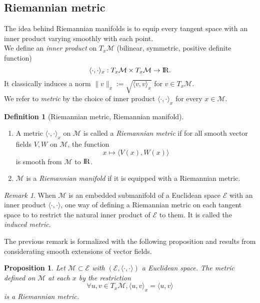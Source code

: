 \documentclass[10pt,a4paper]{book}
\theoremstyle{definition}
\newtheorem{defn}{Definition}[section]
\theoremstyle{plain}
\newtheorem{prop}{Proposition}[section]
\theoremstyle{remark}
\newtheorem{rmk}{Remark}[section]
\newcommand{\E}{\mathcal{E}}
\newcommand \M {\mathcal{M}}
\def\R{{\rm I\kern-0.16em R}}
\begin{document}
\subsection{Riemannian metric}
The idea behind Riemannian manifolds is to equip every tangent space with an inner product varying smoothly with each point.\\ We define an \emph{inner product} on $T_x\M$ (bilinear, symmetric, positive definite function) $$\langle \cdot,\cdot \rangle_x: T_x\M \times T_x\M \to \R.$$ It classically induces a norm $\|v\|_x:=\sqrt{\langle v,v\rangle_x}$ for $v\in T_x\M$.
\\ We refer to \emph{metric} by the choice of inner product $\langle \cdot, \cdot \rangle_x$ for every $x\in \M$.
\begin{defn}[Riemannian metric, Riemannian manifold]~
\begin{enumerate}
\item 
A metric $\langle \cdot, \cdot \rangle_x$ on $\M$ is called a \emph{Riemannian metric} if for all smooth vector fields $V,W$ on $\M$, the function
$$x\mapsto \langle V(x),W(x)\rangle$$
is smooth from $\M$ to $\R$.
\item $\M$ is a \emph{Riemannian manifold} if it is equipped with a Riemannian metric.
\end{enumerate}
\end{defn}
\begin{rmk}
When $\M$ is an embedded submanifold of a Euclidean space $\E$ with an inner product $\langle \cdot, \cdot \rangle$, one way of defining a Riemannian metric on each tangent space to to restrict the natural inner product of $\E$ to them. It is called the \emph{induced metric}.
\end{rmk}
The previous remark is formalized with the following proposition and results from considerating smooth extensions of vector fields.
\begin{prop}
Let $\M \subset \E$ with $(\E,\langle\cdot,\cdot \rangle)$ a Euclidean space. The metric defined on $\M$ at each $x$ by the restriction
$$\forall u,v \in T_x\M, \langle u,v\rangle_x=\langle u,v\rangle$$
is a Riemannian metric.
\end{prop}
\end{document}
